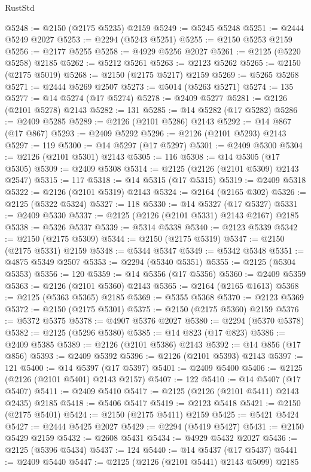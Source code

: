 \begin{lexlean}{RustStd}
\begin{coremodule}
@5248 := @2150 (@2175 @5235) @2159
@5249 := @5245 @5248
@5251 := @2444 @5249 @2027
@5253 := @2294 (@5243 @5251)
@5255 := @2150 @5253 @2159
@5256 := @2177 @5255
@5258 := @4929 @5256 @2027
@5261 := @2125 (@5220 @5258) @2185
@5262 := @5212 @5261
@5263 := @2123 @5262
@5265 := @2150 (@2175 @5019)
@5268 := @2150 (@2175 @5217) @2159
@5269 := @5265 @5268
@5271 := @2444 @5269 @2507
@5273 := @5014 (@5263 @5271)
@5274 := 135
@5277 := @14 @5274 (@17 @5274)
@5278 := @2409 @5277
@5281 := @2126 (@2101 @5278) @2143
@5282 := 131
@5285 := @14 @5282 (@17 @5282)
@5286 := @2409 @5285
@5289 := @2126 (@2101 @5286) @2143
@5292 := @14 @867 (@17 @867)
@5293 := @2409 @5292
@5296 := @2126 (@2101 @5293) @2143
@5297 := 119
@5300 := @14 @5297 (@17 @5297)
@5301 := @2409 @5300
@5304 := @2126 (@2101 @5301) @2143
@5305 := 116
@5308 := @14 @5305 (@17 @5305)
@5309 := @2409 @5308
@5314 := @2125 (@2126 (@2101 @5309) @2143 @2547)
@5315 := 117
@5318 := @14 @5315 (@17 @5315)
@5319 := @2409 @5318
@5322 := @2126 (@2101 @5319) @2143
@5324 := @2164 (@2165 @302)
@5326 := @2125 (@5322 @5324)
@5327 := 118
@5330 := @14 @5327 (@17 @5327)
@5331 := @2409 @5330
@5337 := @2125 (@2126 (@2101 @5331) @2143 @2167) @2185
@5338 := @5326 @5337
@5339 := @5314 @5338
@5340 := @2123 @5339
@5342 := @2150 (@2175 @5309)
@5344 := @2150 (@2175 @5319)
@5347 := @2150 (@2175 @5331) @2159
@5348 := @5344 @5347
@5349 := @5342 @5348
@5351 := @4875 @5349 @2507
@5353 := @2294 (@5340 @5351)
@5355 := @2125 (@5304 @5353)
@5356 := 120
@5359 := @14 @5356 (@17 @5356)
@5360 := @2409 @5359
@5363 := @2126 (@2101 @5360) @2143
@5365 := @2164 (@2165 @1613)
@5368 := @2125 (@5363 @5365) @2185
@5369 := @5355 @5368
@5370 := @2123 @5369
@5372 := @2150 (@2175 @5301)
@5375 := @2150 (@2175 @5360) @2159
@5376 := @5372 @5375
@5378 := @4907 @5376 @2027
@5380 := @2294 (@5370 @5378)
@5382 := @2125 (@5296 @5380)
@5385 := @14 @823 (@17 @823)
@5386 := @2409 @5385
@5389 := @2126 (@2101 @5386) @2143
@5392 := @14 @856 (@17 @856)
@5393 := @2409 @5392
@5396 := @2126 (@2101 @5393) @2143
@5397 := 121
@5400 := @14 @5397 (@17 @5397)
@5401 := @2409 @5400
@5406 := @2125 (@2126 (@2101 @5401) @2143 @2157)
@5407 := 122
@5410 := @14 @5407 (@17 @5407)
@5411 := @2409 @5410
@5417 := @2125 (@2126 (@2101 @5411) @2143 @2435) @2185
@5418 := @5406 @5417
@5419 := @2123 @5418
@5421 := @2150 (@2175 @5401)
@5424 := @2150 (@2175 @5411) @2159
@5425 := @5421 @5424
@5427 := @2444 @5425 @2027
@5429 := @2294 (@5419 @5427)
@5431 := @2150 @5429 @2159
@5432 := @2608 @5431
@5434 := @4929 @5432 @2027
@5436 := @2125 (@5396 @5434)
@5437 := 124
@5440 := @14 @5437 (@17 @5437)
@5441 := @2409 @5440
@5447 := @2125 (@2126 (@2101 @5441) @2143 @5099) @2185

\end{coremodule}
\end{lexlean}
